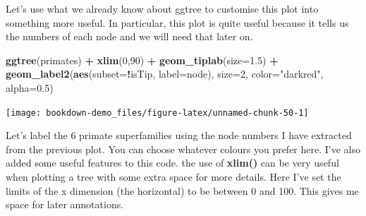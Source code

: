 \documentclass[
]{book}
\newenvironment{Shaded}{\begin{snugshade}}{\end{snugshade}}
\newcommand{\DataTypeTok}[1]{\textcolor[rgb]{0.13,0.29,0.53}{#1}}
\newcommand{\DecValTok}[1]{\textcolor[rgb]{0.00,0.00,0.81}{#1}}
\newcommand{\FloatTok}[1]{\textcolor[rgb]{0.00,0.00,0.81}{#1}}
\newcommand{\KeywordTok}[1]{\textcolor[rgb]{0.13,0.29,0.53}{\textbf{#1}}}
\newcommand{\NormalTok}[1]{#1}
\newcommand{\OperatorTok}[1]{\textcolor[rgb]{0.81,0.36,0.00}{\textbf{#1}}}
\newcommand{\StringTok}[1]{\textcolor[rgb]{0.31,0.60,0.02}{#1}}
\begin{document}
Let's use what we already know about ggtree to customise this plot into something more useful. In particular, this plot is quite useful because it tells us the numbers of each node and we will need that later on.

\begin{Shaded}
\begin{Highlighting}[]
\KeywordTok{ggtree}\NormalTok{(primates) }\OperatorTok{+}
\StringTok{   }\KeywordTok{xlim}\NormalTok{(}\DecValTok{0}\NormalTok{,}\DecValTok{90}\NormalTok{) }\OperatorTok{+}\StringTok{ }
\StringTok{   }\KeywordTok{geom\_tiplab}\NormalTok{(}\DataTypeTok{size=}\FloatTok{1.5}\NormalTok{) }\OperatorTok{+}
\StringTok{   }\KeywordTok{geom\_label2}\NormalTok{(}\KeywordTok{aes}\NormalTok{(}\DataTypeTok{subset=}\OperatorTok{!}\NormalTok{isTip, }\DataTypeTok{label=}\NormalTok{node), }\DataTypeTok{size=}\DecValTok{2}\NormalTok{, }\DataTypeTok{color=}\StringTok{"darkred"}\NormalTok{, }\DataTypeTok{alpha=}\FloatTok{0.5}\NormalTok{)}
\end{Highlighting}
\end{Shaded}

\begin{center}\texttt{[image: bookdown-demo\_files/figure-latex/unnamed-chunk-50-1]} \end{center}

Let's label the 6 primate superfamilies using the node numbers I have extracted from the previous plot. You can choose whatever colours you prefer here. I've also added some useful features to this code. the use of \textbf{xlim()} can be very useful when plotting a tree with some extra space for more details. Here I've set the limits of the x dimension (the horizontal) to be between 0 and 100. This gives me space for later annotations.
\end{document}
